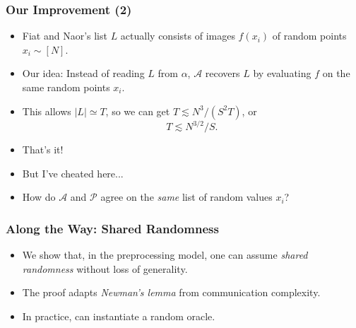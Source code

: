 \documentclass[usenames, dvipsnames, t, table]{beamer}
\newcommand{\inlineauthor}[1]{\raisebox{-0.5 \height}{\texttt{[image: assets/\#1]}}}
\newcommand{\A}{\mathcal{A}}
\renewcommand{\P}{\mathcal{P}}
\begin{document}
  \begin{frame}
    \frametitle{Our Improvement (2)}
    \begin{itemize}
    \item  Fiat and Naor's list $L$ actually consists of \newline
      images $f(x_i)$ of random points $x_i \sim [N]$.
      \pause
    \item Our idea: Instead of reading $L$ from $\alpha$,
      $\A$ recovers $L$ by evaluating $f$ on the same random points $x_i$.
      \pause
    \item This allows $|L| \simeq T$, so we can get $T \lesssim N^3 / (S^2 T)$, or
      \[
        T \lesssim N^{3/2} / S.
      \]
      \mypause
    \item That's it!
    \item But I've cheated here...
      \pause
    \item How do $\A$ and $\P$ agree on the \emph{same} list of random values $x_i$?
      \end{itemize}
  \end{frame}

  \begin{frame}
    \frametitle{Along the Way: Shared Randomness}
    \begin{itemize}
    \item We show that, in the preprocessing model, \newline one can assume \emph{shared randomness}  without loss of generality.
      \pause
    \item The proof adapts \emph{Newman's lemma} \cite{Newman91} \inlineauthor{newman} from communication complexity.
      \pause
    \item In practice, can instantiate a random oracle.
    \end{itemize}
  \end{frame}
\end{document}
